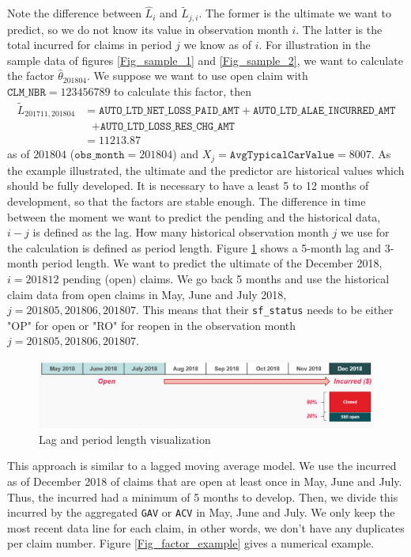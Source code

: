 	Note the difference between $\hat{L}_i$ and $\widetilde{L}_{j,i}$. The former is the ultimate we want to predict, so we do not know its value in observation month $i$. The latter is the total incurred for claims in period $j$ we know as of $i$. For illustration in the sample data of figures \ref{Fig_sample_1} and \ref{Fig_sample_2}, we want to calculate the factor $\hat{\theta}_{201804}$. We suppose we want to use open claim with $ \texttt{CLM\_NBR} = 123456789$ to calculate this factor, then 
	\begin{align*}
	\widetilde{L}_{201711, 201804} &= \texttt{AUTO\_LTD\_NET\_LOSS\_PAID\_AMT} + \texttt{AUTO\_LTD\_ALAE\_INCURRED\_AMT} \\
									& \ \ \	+ \texttt{AUTO\_LTD\_LOSS\_RES\_CHG\_AMT} \\
									&= 11213.87
	\end{align*}
	 as of $201804$ ($\texttt{obs\_month} = 201804$) and $X_j = \texttt{AvgTypicalCarValue} = 8007 $.
	As the example illustrated, the ultimate and the predictor are historical values which should be fully developed. It is necessary to have a least 5 to 12 months of development, so that the factors are stable enough. The difference in time between the moment we want to predict the pending and the historical data, $i - j$ is defined as the lag. How many historical observation month $j$ we use for the calculation is defined as period length. Figure \ref{Fig_lag_pl} shows a 5-month lag and 3-month period length. We want to predict the ultimate of the December 2018, $i = 201812$ pending (open) claims. We go back 5 months and use the historical claim data from open claims in May, June and July 2018, $j=201805, 201806, 201807$. This means that their \texttt{sf\_status} needs to be either "OP" for open or "RO" for reopen in the observation month $j=201805, 201806, 201807$.
	\begin{figure}[H]
		\begin{center}
			\includegraphics[scale=0.4]{Graphiques/lag_pl} 
			\renewcommand{\figurename}{Figure}
			\caption{Lag and period length visualization}\label{Fig_lag_pl}
		\end{center}
	\end{figure}
	This approach is similar to a lagged moving average model. We use the incurred as of December 2018 of claims that are open at least once in May, June and July. Thus, the incurred had a minimum of 5 months to develop. Then, we divide this incurred by the aggregated \texttt{GAV} or \texttt{ACV} in May, June and July. We only keep the most recent data line for each claim, in other words, we don’t have any duplicates per claim number. Figure \ref{Fig_factor_example} gives a numerical example. 
